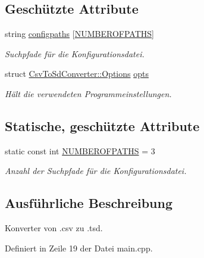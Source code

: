 \subsection*{Geschützte Attribute}
\begin{DoxyCompactItemize}
\item 
string \hyperlink{classCsvToSdConverter_a185377b44506f75748a4d56bc372ee50}{configpaths} \mbox{[}\hyperlink{classCsvToSdConverter_ad2278682506407d3172e8fca834891fe}{N\-U\-M\-B\-E\-R\-O\-F\-P\-A\-T\-H\-S}\mbox{]}
\begin{DoxyCompactList}\small\item\em Suchpfade für die Konfigurationsdatei. \end{DoxyCompactList}\item 
struct \hyperlink{structCsvToSdConverter_1_1Options}{Csv\-To\-Sd\-Converter\-::\-Options} \hyperlink{classCsvToSdConverter_aed83889861a110c9913adb5b9f4d9eb3}{opts}
\begin{DoxyCompactList}\small\item\em Hält die verwendeten Programmeinstellungen. \end{DoxyCompactList}\end{DoxyCompactItemize}
\subsection*{Statische, geschützte Attribute}
\begin{DoxyCompactItemize}
\item 
static const int \hyperlink{classCsvToSdConverter_ad2278682506407d3172e8fca834891fe}{N\-U\-M\-B\-E\-R\-O\-F\-P\-A\-T\-H\-S} = 3
\begin{DoxyCompactList}\small\item\em Anzahl der Suchpfade für die Konfigurationsdatei. \end{DoxyCompactList}\end{DoxyCompactItemize}


\subsection{Ausführliche Beschreibung}
Konverter von .csv zu .tsd. 

Definiert in Zeile 19 der Datei main.\-cpp.



